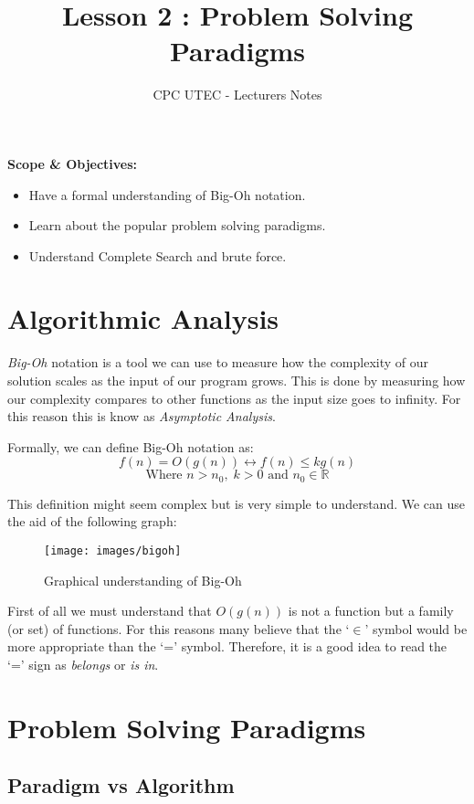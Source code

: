 \documentclass{article}
\title{Lesson 2 : Problem Solving Paradigms}
\author{CPC UTEC - Lecturers Notes}
\begin{document}
\maketitle

\setlength{\parindent}{0mm}

\textbf{Scope \& Objectives:}
\begin{itemize}
	\item Have a formal understanding of Big-Oh notation.
	\item Learn about the popular problem solving paradigms.
	\item Understand Complete Search and brute force.
\end{itemize}

\setlength{\parskip}{4mm}

\section{Algorithmic Analysis}

\textit{Big-Oh} notation is a tool we can use to measure how the complexity of our solution scales as the input of our program grows. This is done by measuring how our complexity compares to other functions as the input size goes to infinity. For this reason this is know as \textit{Asymptotic Analysis}.

Formally, we can define Big-Oh notation as:
$$f(n) = O(g(n)) \longleftrightarrow f(n) \leq kg(n)$$
$$\text{Where } n > n_0, \; k > 0 \text{ and } n_0 \in \mathbb{R}$$

This definition might seem complex but is very simple to understand. We can use the aid of the following graph:

\begin{figure}[H]
	\centering
	\texttt{[image: images/bigoh]}
	\caption{Graphical understanding of Big-Oh}
\end{figure}

First of all we must understand that $O(g(n))$ is not a function but a family (or set) of functions. For this reasons many believe that the `$\in$' symbol would be more appropriate than the `=' symbol. Therefore, it is a good idea to read the `=' sign as \textit{belongs} or \textit{is in}.

\section{Problem Solving Paradigms}

\subsection{Paradigm vs Algorithm}
\end{document}
